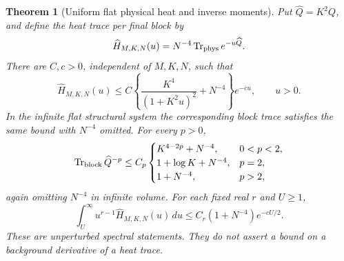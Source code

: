 \documentclass[11pt]{article}
\newtheorem{theorem}{Theorem}[section]
\theoremstyle{remark}
\begin{document}
\begin{theorem}[Uniform flat physical heat and inverse moments]
\label{pvs-main}
Put \(\widehat Q=K^2Q\), and define the heat trace per final block by
\[
 \widehat H_{M,K,N}(u)
   =N^{-4}\operatorname{Tr}_{\rm phys}e^{-u\widehat Q}.
\]
There are \(C,c>0\), independent of \(M,K,N\), such that
\begin{equation}
 \widehat H_{M,K,N}(u)
 \le C\left\{\frac{K^4}{(1+K^2u)^2}+N^{-4}\right\}e^{-cu},
 \qquad u>0.
 \label{pvs-heat}
\end{equation}
In the infinite flat structural system the corresponding block
trace satisfies the same bound with \(N^{-4}\) omitted.
For every \(p>0\),
\begin{equation}
 \operatorname{Tr}_{\rm block}\widehat Q^{-p}
 \le C_p
 \begin{cases}
 K^{4-2p}+N^{-4},&0<p<2,\\
 1+\log K+N^{-4},&p=2,\\
 1+N^{-4},&p>2,
 \end{cases}
 \label{pvs-moments}
\end{equation}
again omitting \(N^{-4}\) in infinite volume.
For each fixed real \(r\) and \(U\ge1\),
\begin{equation}
 \int_U^\infty u^{r-1}\widehat H_{M,K,N}(u)\,du
 \le C_r(1+N^{-4})e^{-cU/2}.
 \label{pvs-tail}
\end{equation}
These are unperturbed spectral statements. They do not assert a
bound on a background derivative of a heat trace.
\end{theorem}
\end{document}
